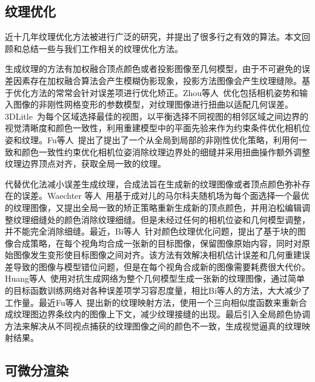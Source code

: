 \subsection{纹理优化}
近十几年纹理优化方法被进行广泛的研究，并提出了很多行之有效的算法。本文回顾和总结一些与我们工作相关的纹理优化方法。\par
\vspace*{2mm}生成纹理的方法有加权融合顶点颜色或者投影图像至几何模型，由于不可避免的误差因素存在加权融合算法会产生模糊伪影现象，投影方法图像会产生纹理缝隙。基于优化方法的常常会针对误差项进行优化矫正。Zhou等人~\cite{zhou2014color}优化包括相机姿势和输入图像的非刚性网格变形的参数模型，对纹理图像进行扭曲以适配几何误差。3DLitle~\cite{huang20173dlite}为每个区域选择最佳的视图，以平衡选择不同视图的相邻区域之间边界的视觉清晰度和颜色一致性，利用重建模型中的平面先验来作为约束条件优化相机位姿和纹理。Fu等人~\cite{fu2018texture}提出了提出了一个从全局到局部的非刚性优化策略，利用何一致和颜色一致性约束优化相机位姿消除纹理边界处的细缝并采用扭曲操作额外调整纹理边界顶点对齐，获取全局一致的纹理。


\vspace*{2mm}代替优化法减小误差生成纹理，合成法旨在生成新的纹理图像或者顶点颜色弥补存在的误差。Waechter 等人~\cite{waechter2014let}用基于成对儿的马尔科夫随机场为每个面选择一个最优的纹理图像，又提出全局一致的矫正策略重新生成新的顶点颜色，并用泊松编辑调整纹理细缝处的颜色消除纹理细缝。但是未经过任何的相机位姿和几何模型调整，并不能完全消除细缝。最近，Bi等人~\cite{bi2017patch}针对颜色纹理优化问题，提出了基于块的图像合成策略，在每个视角均合成一张新的目标图像，保留图像原始内容，同时对原始图像发生变形使目标图像之间对齐。该方法有效解决相机估计误差和几何重建误差导致的图像与模型错位问题，但是在每个视角合成新的图像需要耗费很大代价。Huang等人~\cite{JingweiHuang2020AdversarialTO}使用对抗生成网络为整个几何模型生成一张新的纹理图像，通过简单的目标函数训练网络对各种误差项学习容忍度量，相比Bi等人的方法，大大减少了工作量。最近Fu等人~\cite{fu2021seamless}提出新的纹理映射方法，使用一个三向相似度函数来重新合成纹理图边界条纹内的图像上下文，减少纹理接缝的出现。最后引入全局颜色协调方法来解决从不同视点捕获的纹理图像之间的颜色不一致，生成视觉逼真的纹理映射结果。

\subsection{可微分渲染}

